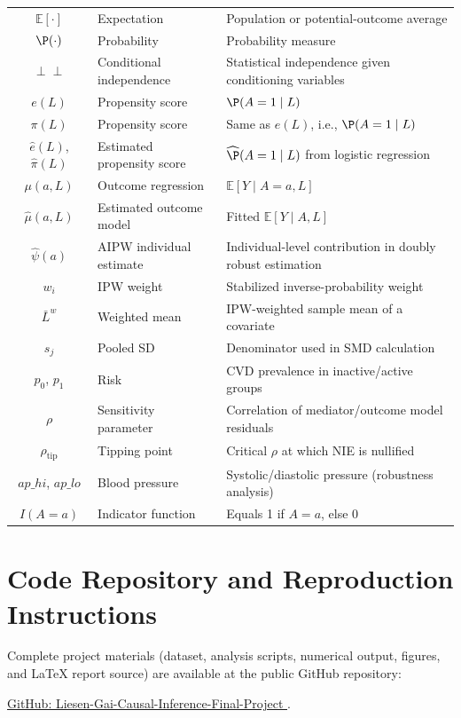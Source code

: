\documentclass[12pt,a4paper]{article}
\newcommand{\E}{\mathbb{E}}
\newcommand{\indep}{\perp\!\!\!\perp}
\begin{document}
\begin{longtable}{@{}clp{8.2cm}@{}}
$\E[\cdot]$ & Expectation & Population or potential-outcome average \\
$\P(\cdot)$ & Probability & Probability measure \\
$\indep$ & Conditional independence & Statistical independence given conditioning variables \\
$e(L)$ & Propensity score & $\P(A=1\mid L)$ \\
$\pi(L)$ & Propensity score & Same as $e(L)$, i.e., $\P(A=1\mid L)$ \\
$\hat e(L)$, $\hat\pi(L)$ & Estimated propensity score & $\widehat{\P}(A=1\mid L)$ from logistic regression \\
$\mu(a,L)$ & Outcome regression & $\E[Y\mid A=a,L]$ \\
$\hat\mu(a,L)$ & Estimated outcome model & Fitted $\E[Y\mid A,L]$ \\
$\hat\psi(a)$ & AIPW individual estimate & Individual-level contribution in doubly robust estimation \\
$w_i$ & IPW weight & Stabilized inverse-probability weight \\
$\bar L^w$ & Weighted mean & IPW-weighted sample mean of a covariate \\
$s_j$ & Pooled SD & Denominator used in SMD calculation \\
$p_0$, $p_1$ & Risk & CVD prevalence in inactive/active groups \\
$\rho$ & Sensitivity parameter & Correlation of mediator/outcome model residuals \\
$\rho_{\text{tip}}$ & Tipping point & Critical $\rho$ at which NIE is nullified \\
$ap\_hi$, $ap\_lo$ & Blood pressure & Systolic/diastolic pressure (robustness analysis) \\
$I(A=a)$ & Indicator function & Equals 1 if $A=a$, else 0 \\
\end{longtable}
\normalsize

\section{Code Repository and Reproduction Instructions}
\label{app:repo}

Complete project materials (dataset, analysis scripts, numerical output, figures, and LaTeX report source) are available at the public GitHub repository:

\noindent\href{https://github.com/daomuyang/Liesen-Gai-Causal-Inference-Final-Project}{
  GitHub: Liesen-Gai-Causal-Inference-Final-Project
}.
\end{document}
